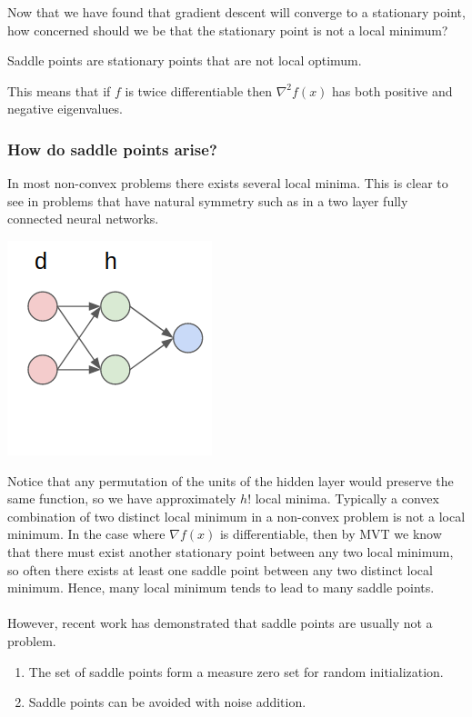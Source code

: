 Now that we have found that gradient descent will converge to a stationary point, how concerned should we be that the stationary point is not a local minimum?

\begin{definition}
Saddle points are stationary points that are not local optimum.
\end{definition}
This means that if $f$ is twice differentiable then $\nabla^2 f(x)$ has both positive and negative eigenvalues.
\subsubsection{How do saddle points arise?}
In most non-convex problems there exists several local minima. This is clear to see in problems that have natural symmetry such as in a two layer fully connected neural networks. 
\begin{center}
\includegraphics[width=0.3\linewidth, height=0.3\linewidth]{figures/lecture_17_neural_network.png} 
\end{center}
Notice that any permutation of the units of the hidden layer would preserve the same function, so we have approximately $h!$ local minima. Typically a convex combination of two distinct local minimum in a non-convex problem is not a local minimum. In the case where $\nabla f(x)$ is differentiable, then by MVT we know that there must exist another stationary point between any two local minimum, so often there exists at least one saddle point between any two distinct local minimum. Hence, many local minimum tends to lead to many saddle points. \\
\\
However, recent work has demonstrated that saddle points are usually not a problem.
\begin{enumerate}
    \item The set of saddle points form a measure zero set for random initialization. \cite{DBLP:journals/corr/GeHJY15}
    \item Saddle points can be avoided with noise addition. \cite{DBLP:journals/corr/abs-1710-07406}
\end{enumerate}
\printbibliography
